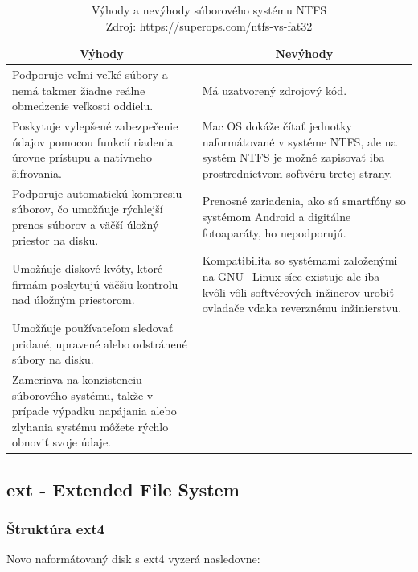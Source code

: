 \documentclass[12pt,oneside,slovak,a4paper]{article}
\begin{document}
\begin{table}[H]
\begin{tabularx}{\linewidth}{|X|X|}
\hline
\multicolumn{1}{|c|}{\textbf{Výhody}} & \multicolumn{1}{c|}{\textbf{Nevýhody}} \\ \hline
Podporuje veľmi veľké súbory a nemá takmer žiadne reálne obmedzenie veľkosti oddielu. & Má uzatvorený zdrojový kód. \\ \hline
Poskytuje vylepšené zabezpečenie údajov pomocou funkcií riadenia úrovne prístupu a natívneho šifrovania. & Mac OS dokáže čítať jednotky naformátované v systéme NTFS, ale na systém NTFS je možné zapisovať iba prostredníctvom softvéru tretej strany. \\ \hline
Podporuje automatickú kompresiu súborov, čo umožňuje rýchlejší prenos súborov a väčší úložný priestor na disku. & Prenosné zariadenia, ako sú smartfóny so systémom Android a digitálne fotoaparáty, ho nepodporujú. \\ \hline
Umožňuje diskové kvóty, ktoré firmám poskytujú väčšiu kontrolu nad úložným priestorom. & Kompatibilita so systémami založenými na GNU+Linux síce existuje ale iba kvôli vôli softvérových inžinerov urobiť ovladače vďaka reverznému inžinierstvu. \\ \hline
Umožňuje používateľom sledovať pridané, upravené alebo odstránené súbory na disku. &  \\ \hline
Zameriava na konzistenciu súborového systému, takže v prípade výpadku napájania alebo zlyhania systému môžete rýchlo obnoviť svoje údaje. &  \\ \hline
\end{tabularx}
\centering
\captionsetup{justification=centering,margin=2cm}
\caption{Výhody a nevýhody súborového systému NTFS \\ Zdroj: https://superops.com/ntfs-vs-fat32}
\end{table}

\subsection{ext - Extended File System}

\subsubsection{Štruktúra ext4}
Novo naformátovaný disk s ext4 vyzerá nasledovne:
\end{document}

